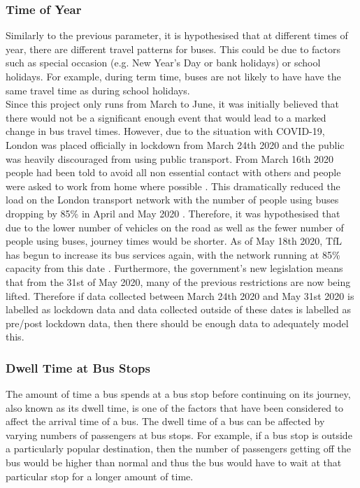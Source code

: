 \subsubsection{Time of Year}

Similarly to the previous parameter, it is hypothesised that at different times of year, there are different travel patterns for buses. This could be due to factors such as special occasion (e.g. New Year's Day or bank holidays) or school holidays. For example, during term time, buses are not likely to have have the same travel time as during school holidays. \\

Since this project only runs from March to June, it was initially believed that there would not be a significant enough event that would lead to a marked change in bus travel times. However, due to the situation with COVID-19, London was placed officially in lockdown from March 24th 2020 and the public was heavily discouraged from using public transport. From March 16th 2020 people had been told to avoid all non essential contact with others and people were asked to work from home where possible \cite{london-lockdown-dates}. This dramatically reduced the load on the London transport network with the number of people using buses dropping by 85\% in April and May 2020 \cite{tfl-press-release-april}. Therefore, it was hypothesised that due to the lower number of vehicles on the road as well as the fewer number of people using buses, journey times would be shorter. As of May 18th 2020, TfL has begun to increase its bus services again, with the network running at 85\% capacity from this date \cite{tfl-press-release-may}. Furthermore, the government's new legislation means that from the 31st of May 2020, many of the previous restrictions are now being lifted. Therefore if data collected between March 24th 2020 and May 31st 2020 is labelled as lockdown data and data collected outside of these dates is labelled as pre/post lockdown data, then there should be enough data to adequately model this. \\

\subsubsection{Dwell Time at Bus Stops}

The amount of time a bus spends at a bus stop before continuing on its journey, also known as its dwell time, is one of the factors that have been considered to affect the arrival time of a bus. The dwell time of a bus can be affected by varying numbers of passengers at bus stops. For example, if a bus stop is outside a particularly popular destination, then the number of passengers getting off the bus would be higher than normal and thus the bus would have to wait at that particular stop for a longer amount of time. \\

